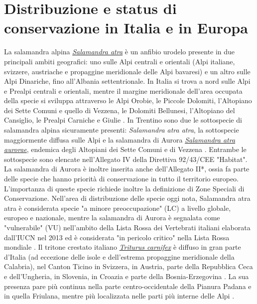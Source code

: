 \documentclass[10pt,twoside,openany,x11names,svgnames,italian,a5paper,dvipsnames,table]{memoir}
\begin{document}
\section{Distribuzione e status di conservazione in Italia e in Europa}
La salamandra alpina \href{http://217.199.4.93/webgis/?specie=Salamandra%20atra}{\emph{Salamandra atra}} è un anfibio urodelo presente in due principali ambiti geografici: uno sulle Alpi centrali e orientali (Alpi italiane, svizzere, austriache e propaggine meridionale delle Alpi bavaresi) e un altro sulle Alpi Dinariche, fino all'Albania settentrionale. In Italia si trova a nord sulle Alpi e Prealpi centrali e orientali, mentre il margine meridionale dell'area occupata della specie si sviluppa attraverso le Alpi Orobie, le Piccole Dolomiti, l'Altopiano dei Sette Comuni e quello di Vezzena, le Dolomiti Bellunesi, l'Altopiano del Cansiglio, le Prealpi Carniche e Giulie \cite{Bellon08b} \cite{Bernini04} \cite{Bonato07} \cite{Bovero13} \cite{Sindaco06}. In Trentino sono due le sottospecie di salamandra alpina sicuramente presenti: \emph{Salamandra atra atra}, la sottospecie maggiormente diffusa sulle Alpi e la salamandra di Aurora \href{http://217.199.4.93/webgis/?specie=Salamandra%20atra%20aurorae}{\emph{Salamandra atra aurorae}}, endemica degli Altopiani dei Sette Comuni e di Vezzena \cite{AAVV11b} \cite{Beukema08} \cite{Bonato01} \cite{Bonato00} \cite{Caldonazzi02} \cite{Romanazzi14}.
Entrambe le sottospecie sono elencate nell'Allegato IV della Direttiva 92/43/CEE "Habitat". La salamandra di Aurora è inoltre inserita anche dell'Allegato II*, ossia fa parte delle specie che hanno priorità di conservazione in tutto il territorio europeo. L’importanza di queste specie richiede inoltre la definizione di Zone Speciali di Conservazione. Nell’area di distribuzione delle specie oggi nota, Salamandra atra atra è considerata specie "a minore preoccupazione" (LC) a livello globale, europeo e nazionale, mentre la salamandra di Aurora è segnalata come "vulnerabile" (VU) nell'ambito della Lista Rossa dei Vertebrati italiani elaborata dall'IUCN nel 2013 ed è considerata "in pericolo critico" nella Lista Rossa mondiale \cite{AAVV11b} \cite{Bellon08b} \cite{Caldonazzi02} \cite{Rondinini13} \cite{Temple09}. 
Il tritone crestato italiano \href{http://217.199.4.93/webgis/?specie=Triturus%20carnifex}{\emph{Triturus carnifex}} è diffuso in gran parte d'Italia (ad eccezione delle isole e dell'estrema propaggine meridionale della Calabria), nel Canton Ticino in Svizzera, in Austria, parte della Repubblica Ceca e dell'Ungheria, in Slovenia, in Croazia e parte della Bosnia-Erzegovina \cite{Bellon08c} \cite{Damm07} \cite{Edgar06} \cite{Sindaco06}. La sua presenza pare più continua nella parte centro-occidentale della Pianura Padana e in quella Friulana, mentre più localizzata nelle parti più interne delle Alpi \cite{Bellon08b} \cite{Bernini04} \cite{Bonato07} \cite{Bovero13}.
\end{document}
